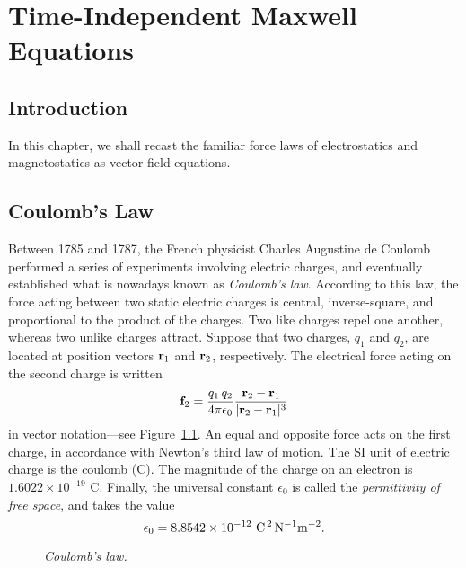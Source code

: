 \chapter{Time-Independent Maxwell Equations}\label{maxwell1}

\section{Introduction}
In this chapter, we shall recast the familiar force laws of electrostatics and magnetostatics
 as vector field equations.

\section{Coulomb's Law}
Between 1785 and 1787, the French physicist Charles Augustine de Coulomb performed
a series of experiments involving electric charges, and 
eventually established what is
nowadays known  as {\em Coulomb's law}. According to this law, the force
acting between two static electric charges is central, inverse-square,
and proportional to the product of the charges. Two like
charges repel one another,
whereas two unlike charges attract. Suppose that two charges, $q_1$ 
and $q_2$, are 
located at position vectors  ${\bf r}_1$ and ${\bf r}_2$, respectively. The 
electrical force acting
on the second charge is written
\begin{equation}\label{e31}
{\bf f}_2 = \frac{q_1\, q_2}{4\pi\epsilon_0} \frac{{\bf r}_2 - {\bf r}_1}
{|{\bf r}_2-{\bf r}_1|^{3}}
\end{equation}
in vector notation---see Figure~\ref{f24}.  An equal and
opposite force acts on the first charge,
in accordance with Newton's third law of motion.
The SI unit of electric charge is the coulomb (C). The magnitude of the charge on
an electron is $1.6022\times 10^{-19}$ C. Finally, the universal constant $\epsilon_0$
is called the {\em permittivity of free space}, and takes the value
\begin{equation}
\epsilon_0 = 8.8542\times 10^{-12} \,\,{\rm C^{\,2} \,N^{-1}m^{-2}}.
\end{equation}
\begin{figure}
\epsfysize=1.5in
\centerline{}
\caption{\em Coulomb's law.}\label{f24}
\end{figure}

